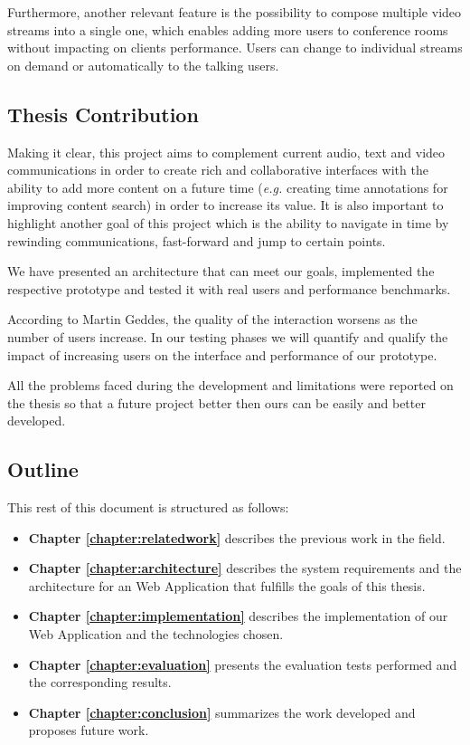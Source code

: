 \documentclass[conference,compsoc,a4paper]{IEEEtran}
\begin{document}
	Furthermore, another relevant feature is the possibility to compose multiple video streams into a single one, which enables adding more users to conference rooms without impacting on clients performance. Users can change to individual streams on demand or automatically to the talking users.
        

\subsection{Thesis Contribution}
\label{section:contribution}

Making it clear, this project aims to complement current audio, text and video communications in order to create rich and collaborative interfaces with the ability to add more content on a future time (\emph{e.g.} creating time annotations for improving content search) in order to increase its value. It is also important to highlight another goal of this project which is the ability to navigate in time by rewinding communications, fast-forward and jump to certain points.

	We have presented an architecture that can meet our goals, implemented the respective prototype and tested it with real users and performance benchmarks.

	According to Martin Geddes, the quality of the interaction worsens as the number of users increase\cite{geddes}. In our testing phases we will quantify and qualify the impact of increasing users on the interface and performance of our prototype. 

	All the problems faced during the development and limitations were reported on the thesis so that a future project better then ours can be easily and better developed.

\subsection{Outline}

This rest of this document is structured as follows:

\begin{itemize}

\item \textbf{Chapter \ref{chapter:relatedwork}} describes the previous work in the field.
\item \textbf{Chapter \ref{chapter:architecture}} describes the system requirements and the architecture for an Web Application that fulfills the goals of this thesis.
\item \textbf{Chapter \ref{chapter:implementation}} describes the implementation of our Web Application and the technologies chosen.
\item \textbf{Chapter \ref{chapter:evaluation}} presents the evaluation tests performed and the corresponding results.
\item \textbf{Chapter \ref{chapter:conclusion}} summarizes the work developed and proposes future work.
\end{itemize}
\end{document}
